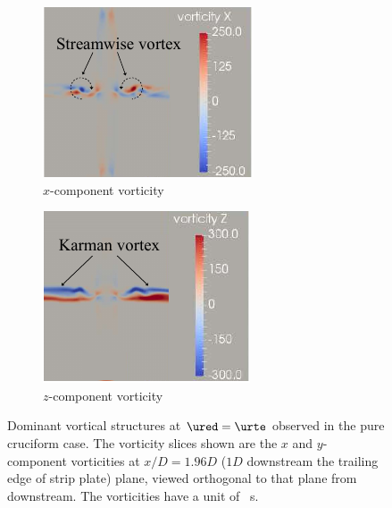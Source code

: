 \documentclass[a4paper,fleqn]{cas-sc}
\begin{document}
\begin{figure}
  \centering
  \begin{subfigure}[h]{0.28\textwidth}
    \includegraphics[width=\textwidth]{figs/vorx90}
    \caption{$x$-component vorticity}
    \label{fig:vorx90}
  \end{subfigure}
  \hspace{6mm}
  \begin{subfigure}[h]{0.28\textwidth}
    \includegraphics[width=\textwidth]{figs/vorz90}
    \caption{$z$-component vorticity}
    \label{fig:vorz90}
  \end{subfigure}

  \caption{Dominant vortical structures at $\ured = \urte$ observed in the pure cruciform case. The vorticity slices shown are the $x$ and $y$-component vorticities at $x/D = 1.96D$ ($1D$ downstream the trailing edge of strip plate) plane, viewed orthogonal to that plane from downstream. The vorticities have a unit of \si{\per\second}.} \label{fig:vortStruct90}
\end{figure}
\end{document}
